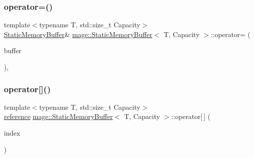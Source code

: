 \mbox{\label{classmage_1_1_static_memory_buffer_a560aa20cc2f553eccf2b8861e211efc5}} 
\subsubsection{\texorpdfstring{operator=()}{operator=()}\hspace{0.1cm}{\footnotesize\ttfamily [2/2]}}
{\footnotesize\ttfamily template$<$typename T, std\+::size\+\_\+t Capacity$>$ \\
\mbox{\hyperlink{classmage_1_1_static_memory_buffer}{Static\+Memory\+Buffer}}\& \mbox{\hyperlink{classmage_1_1_static_memory_buffer}{mage\+::\+Static\+Memory\+Buffer}}$<$ T, Capacity $>$\+::operator= (\begin{DoxyParamCaption}\item[{\mbox{\hyperlink{classmage_1_1_static_memory_buffer}{Static\+Memory\+Buffer}}$<$ T, Capacity $>$ \&\&}]{buffer }\end{DoxyParamCaption})\hspace{0.3cm}{\ttfamily [default]}, {\ttfamily [noexcept]}}

\mbox{\label{classmage_1_1_static_memory_buffer_aeb41deead4aa38fa6f7203d78fdadfaf}} 
\subsubsection{\texorpdfstring{operator[]()}{operator[]()}\hspace{0.1cm}{\footnotesize\ttfamily [1/2]}}
{\footnotesize\ttfamily template$<$typename T, std\+::size\+\_\+t Capacity$>$ \\
\mbox{\hyperlink{classmage_1_1_static_memory_buffer_ac00b0718b8b57bcaee2a7904637fc031}{reference}} \mbox{\hyperlink{classmage_1_1_static_memory_buffer}{mage\+::\+Static\+Memory\+Buffer}}$<$ T, Capacity $>$\+::operator\mbox{[}$\,$\mbox{]} (\begin{DoxyParamCaption}\item[{\mbox{\hyperlink{classmage_1_1_static_memory_buffer_a13e19b7af61a49400c5be360f09aadc8}{size\+\_\+type}}}]{index }\end{DoxyParamCaption})\hspace{0.3cm}{\ttfamily [noexcept]}}

